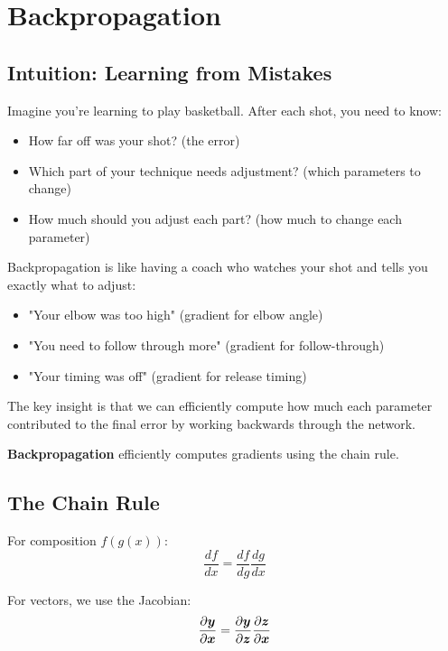 
\section{Backpropagation }
\label{sec:backpropagation}

\subsection{Intuition: Learning from Mistakes}

Imagine you're learning to play basketball. After each shot, you need to know:
\begin{itemize}
    \item How far off was your shot? (the error)
    \item Which part of your technique needs adjustment? (which parameters to change)
    \item How much should you adjust each part? (how much to change each parameter)
\end{itemize}

Backpropagation is like having a coach who watches your shot and tells you exactly what to adjust:
\begin{itemize}
    \item "Your elbow was too high" (gradient for elbow angle)
    \item "You need to follow through more" (gradient for follow-through)
    \item "Your timing was off" (gradient for release timing)
\end{itemize}

The key insight is that we can efficiently compute how much each parameter contributed to the final error by working backwards through the network.

\textbf{Backpropagation} efficiently computes gradients using the chain rule.

\subsection{The Chain Rule}

For composition $f(g(x))$:
\begin{equation}
\frac{df}{dx} = \frac{df}{dg} \frac{dg}{dx}
\end{equation}

For vectors, we use the Jacobian:
\begin{equation}
\frac{\partial \boldsymbol{y}}{\partial \boldsymbol{x}} = \frac{\partial \boldsymbol{y}}{\partial \boldsymbol{z}} \frac{\partial \boldsymbol{z}}{\partial \boldsymbol{x}}
\end{equation}

